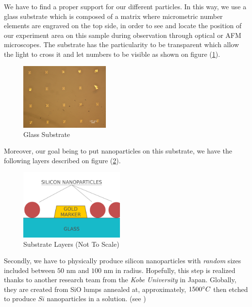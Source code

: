 \documentclass{article}
\numberwithin{equation}{section}
\begin{document}
We have to find a proper support for our different particles. In this way, we use a glass substrate which is composed of a matrix where micrometric number elements are engraved on the top side, in order to see and locate the position of our experiment area on this sample during observation through optical or AFM microscopes. The substrate has the particularity to be transparent which allow the light to cross it and let numbers to be visible as shown on figure (\ref{fig:substrate}).
\begin{figure}[h!]
    \centering
    \includegraphics[width=0.4\textwidth, height=0.35\textwidth]{glass_substrate.png}
    \caption{Glass Substrate}
    \label{fig:substrate}
\end{figure}
Moreover, our goal being to put nanoparticles on this substrate, we have the following layers described on figure (\ref{fig:substrate_layers}).
\begin{figure}[h!]
    \centering
    \includegraphics[width=0.47\textwidth, height=0.32\textwidth]{substrate_layers_v2.png}
    \caption{Substrate Layers (Not To Scale)}
    \label{fig:substrate_layers}
\end{figure}

Secondly, we have to physically produce silicon nanoparticles with \textit{random} sizes included between $50$ nm and $100$ nm in radius. Hopefully, this step is realized thanks to another research team from the \textit{Kobe University} in Japan. Globally, they are created from SiO lumps annealed at, approximately, $1500 \degree C$ then etched to produce $Si$ nanoparticles in a solution. (see \cite{hiroshitakumaminoru})
\end{document}

